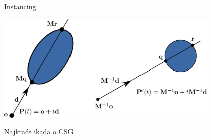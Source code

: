 \documentclass[9pt]{beamer}
\begin{document}
\begin{frame}{Instancing}
\begin{center}
	\includegraphics[width=0.8\textwidth]{slike/instancing_primjer.png}
\end{center}
\end{frame}

\begin{frame}{Najkraće ikada o CSG}
	\begin{columns}
		\begin{column}{0.5\textwidth}
				\begin{center}

\end{center}
\end{column}
\end{columns}
\end{frame}
\end{document}
